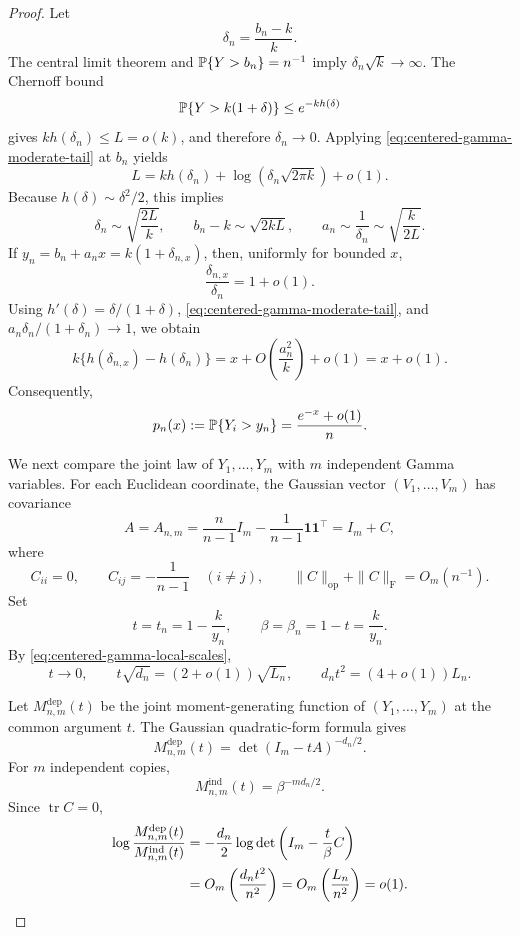 \begin{proof}
Let
\[
 \delta_n=\frac{b_n-k}{k}.
\]
The central limit theorem and \(\mathbb P\{Y>b_n\}=n^{-1}\) imply
\(\delta_n\sqrt{k}\to\infty\). The Chernoff bound
\[
 \mathbb P\{Y>k(1+\delta)\}\le e^{-kh(\delta)}
\]
gives \(kh(\delta_n)\le L=o(k)\), and therefore \(\delta_n\to0\).
Applying \eqref{eq:centered-gamma-moderate-tail} at \(b_n\) yields
\[
 L
 =
 kh(\delta_n)+\log(\delta_n\sqrt{2\pi k})+o(1).
\]
Because \(h(\delta)\sim\delta^2/2\), this implies
\begin{equation}
\label{eq:centered-gamma-local-scales}
 \delta_n\sim\sqrt{\frac{2L}{k}},
 \qquad
 b_n-k\sim\sqrt{2kL},
 \qquad
 a_n\sim\frac1{\delta_n}\sim\sqrt{\frac{k}{2L}}.
\end{equation}
If \(y_n=b_n+a_nx=k(1+\delta_{n,x})\), then, uniformly for bounded \(x\),
\[
 \frac{\delta_{n,x}}{\delta_n}=1+o(1).
\]
Using \(h'(\delta)=\delta/(1+\delta)\),
\eqref{eq:centered-gamma-moderate-tail}, and
\(a_n\delta_n/(1+\delta_n)\to1\), we obtain
\[
 k\{h(\delta_{n,x})-h(\delta_n)\}
 =
 x+O\left(\frac{a_n^2}{k}\right)+o(1)
 =
 x+o(1).
\]
Consequently,
\begin{equation}
\label{eq:centered-gamma-local-tail-ratio}
 p_n(x):=\mathbb P\{Y_i>y_n\}
 =
 \frac{e^{-x}+o(1)}{n}.
\end{equation}

We next compare the joint law of \(Y_1,\ldots,Y_m\) with \(m\)
independent Gamma variables. For each Euclidean coordinate, the Gaussian
vector \((V_1,\ldots,V_m)\) has covariance
\[
 A=A_{n,m}
 =
 \frac n{n-1}I_m-\frac1{n-1}\mathbf1\mathbf1^\top
 =
 I_m+C,
\]
where
\[
 C_{ii}=0,
 \qquad
 C_{ij}=-\frac1{n-1}\quad(i\ne j),
 \qquad
 \|C\|_{\mathrm{op}}+\|C\|_{\mathrm F}=O_m(n^{-1}).
\]
Set
\[
 t=t_n=1-\frac{k}{y_n},
 \qquad
 \beta=\beta_n=1-t=\frac{k}{y_n}.
\]
By \eqref{eq:centered-gamma-local-scales},
\begin{equation}
\label{eq:centered-tilt-scale}
 t\to0,
 \qquad
 t\sqrt{d_n}=(2+o(1))\sqrt{L_n},
 \qquad
 d_nt^2=(4+o(1))L_n.
\end{equation}

Let \(M_{n,m}^{\mathrm{dep}}(t)\) be the joint moment-generating function
of \((Y_1,\ldots,Y_m)\) at the common argument \(t\). The Gaussian
quadratic-form formula gives
\[
 M_{n,m}^{\mathrm{dep}}(t)
 =
 \det(I_m-tA)^{-d_n/2}.
\]
For \(m\) independent copies,
\[
 M_{n,m}^{\mathrm{ind}}(t)=\beta^{-md_n/2}.
\]
Since \(\operatorname{tr}C=0\),
\begin{align}
\label{eq:centered-tilt-normalizer}
 \log\frac{M_{n,m}^{\mathrm{dep}}(t)}
               {M_{n,m}^{\mathrm{ind}}(t)}
 &=
 -\frac{d_n}{2}
 \log\det\left(I_m-\frac{t}{\beta}C\right) \notag\\
 &=
 O_m\left(\frac{d_nt^2}{n^2}\right)
 =
 O_m\left(\frac{L_n}{n^2}\right)
 =
 o(1).
\end{align}


\end{proof}

